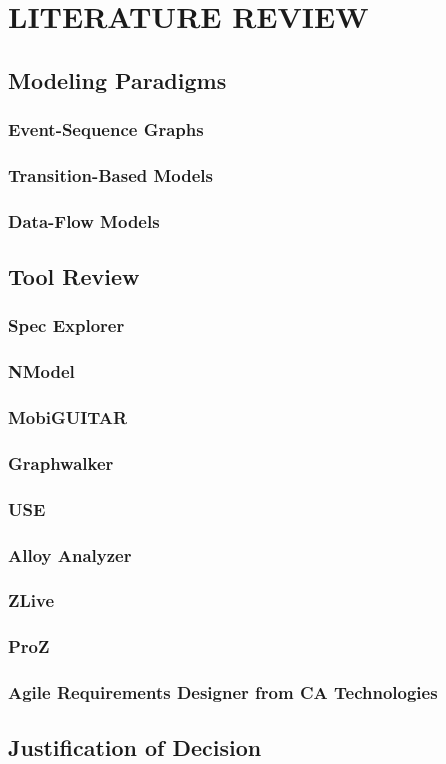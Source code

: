 \chapter{LITERATURE REVIEW}
\label{chapter:literature_review}


\section{Modeling Paradigms}
\subsection{Event-Sequence Graphs}
\subsection{Transition-Based Models}
\subsection{Data-Flow Models}

\section{Tool Review}
\subsection{Spec Explorer}
\subsection{NModel}
\subsection{MobiGUITAR}
\subsection{Graphwalker}
\subsection{USE}
\subsection{Alloy Analyzer}
\subsection{ZLive}
\subsection{ProZ}
\subsection{Agile Requirements Designer from CA Technologies}

\section{Justification of Decision}